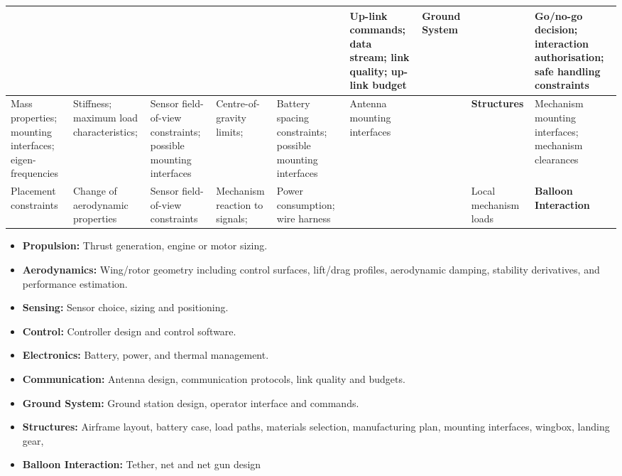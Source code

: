 \begin{landscape}
\begin{table}[H]
\begin{adjustbox}{max totalheight=0.95\textheight, max width=\linewidth}
\begin{tabularx}{\linewidth}{|X|X|X|X|X|X|X|X|X|}
& 
& 
& 
& 
& Up-link commands; data stream; link quality; up-link budget
& \cellcolor{diagblue}\centering\textbf{Ground System}
& 
& Go/no-go decision; interaction authorisation; safe handling constraints

\tabularnewline \hline

Mass properties; mounting interfaces; eigen-frequencies
& Stiffness; maximum load characteristics;  
& Sensor field-of-view constraints; possible mounting interfaces
& Centre-of-gravity limits; 
& Battery spacing constraints; possible mounting interfaces
& Antenna mounting interfaces
& 
& \cellcolor{diagblue}\centering\textbf{Structures}
& Mechanism mounting interfaces; mechanism clearances
\tabularnewline \hline

Placement constraints
& Change of aerodynamic properties
& Sensor field-of-view constraints
& Mechanism reaction to signals;  
& Power consumption; wire harness
& 
&
& Local mechanism loads
& \cellcolor{diagblue}\centering\textbf{Balloon Interaction}
\tabularnewline \hline

\end{tabularx}
\end{adjustbox}
\end{table}
\end{landscape}

\begin{itemize}
    \item \textbf{Propulsion:} Thrust generation, engine or motor sizing.
    \item \textbf{Aerodynamics:} Wing/rotor geometry including control surfaces, lift/drag profiles, aerodynamic damping, stability derivatives, and performance estimation.
    \item \textbf{Sensing:} Sensor choice, sizing and positioning.
    \item \textbf{Control:} Controller design and control software.
    \item \textbf{Electronics:} Battery, power, and thermal management.
    \item \textbf{Communication:} Antenna design, communication protocols, link quality and budgets.
    \item \textbf{Ground System:} Ground station design, operator interface and commands.
    \item \textbf{Structures:} Airframe layout, battery case, load paths, materials selection, manufacturing plan, mounting interfaces, wingbox, landing gear, 
    \item \textbf{Balloon Interaction:} Tether, net and net gun design
\end{itemize}


